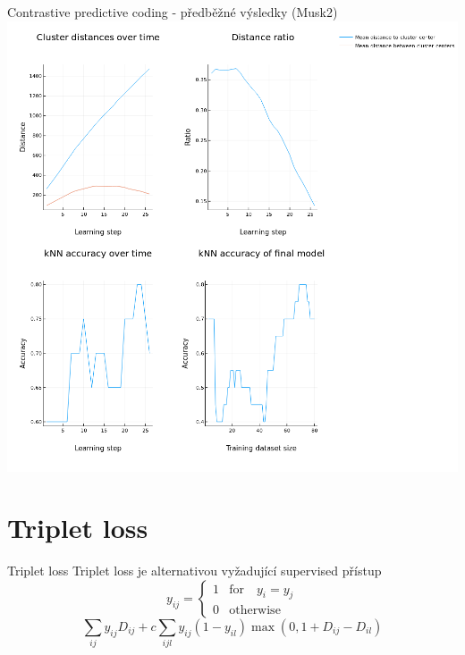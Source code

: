 \documentclass[10pt]{beamer}
\begin{document}
\begin{frame}{Contrastive predictive coding - předběžné výsledky (Musk2)}
	\centering
	\includegraphics[width=0.7\pagewidth]{images/CPC.png}
\end{frame}

\section{Triplet loss}

\begin{frame}{Triplet loss}
	Triplet loss je alternativou vyžadující supervised přístup
	\[ y_{ij} =
\begin{cases}
	1 &\text{for} \quad y_i = y_j \\
	0 &\text{otherwise}
\end{cases}
\]
\[ \sum_{ij} y_{ij} D_{ij} + c \sum_{ijl} y_{ij} \left( 1 - y_{il} \right) \max \left( 0, 1 + D_{ij} - D_{il} \right) \]
\end{frame}
\end{document}

